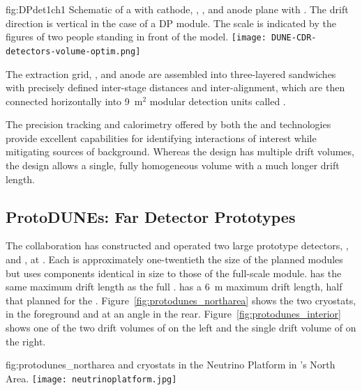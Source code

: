 \begin{dunefigure}{fig:DPdet1ch1}
  {Schematic of a \nominalmodsize {}    with cathode, , , and anode plane with . The drift direction is vertical in the case of a DP module. The scale is indicated by the figures of two people standing in front of the model.}
  \texttt{[image: DUNE-CDR-detectors-volume-optim.png]}
\end{dunefigure}

The extraction grid, , and anode are assembled into three-layered sandwiches with precisely defined inter-stage distances and inter-alignment,  which are then connected horizontally into \num{9}~m$^2$ modular detection units called .

The precision tracking and calorimetry offered by both the  and  technologies provide excellent capabilities for identifying interactions of interest while mitigating sources of background.  Whereas the  design has multiple drift volumes, the  design allows a single, fully homogeneous  volume with a much longer drift length.

\FloatBarrier

\subsection{ProtoDUNEs: Far Detector Prototypes}
\label{sec:exec:overall:pdune}

The  collaboration has constructed and operated 
two large prototype detectors, , and , at .  %
 Each is approximately one-twentieth the size of the planned  modules but uses components identical in size to those of the full-scale module.  has the same \spmaxdrift maximum drift length as the full .  has a \SI{6}{m} maximum drift length, half that planned for the .  Figure~\ref{fig:protodunes_northarea} shows the two cryostats,  in the foreground and  at an angle in the rear. Figure~\ref{fig:protodunes_interior} shows one of the two drift volumes of  on the left and the single drift volume of  on the right.

\begin{dunefigure}
{fig:protodunes_northarea}
{ and  cryostats in the  Neutrino Platform in 's North Area.}
\texttt{[image: neutrinoplatform.jpg]}
\end{dunefigure}

